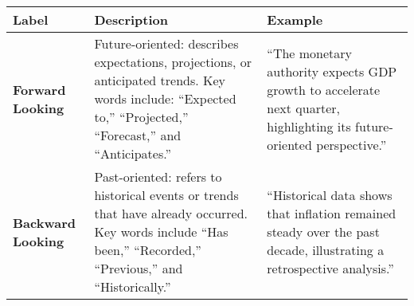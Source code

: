 \begin{table*}
    \caption{}
    \vspace{1em}
    \centering
    \begin{tabular}{p{} p{} p{}}
    \toprule
    \textbf{Label} & \textbf{Description} & \textbf{Example} \\
    \midrule
    \textbf{Forward Looking} & 
    Future-oriented: describes expectations, projections, or anticipated trends. Key words include: ``Expected to,'' ``Projected,'' ``Forecast,'' and ``Anticipates.'' 
    & “The monetary authority expects GDP growth to accelerate next quarter, highlighting its future-oriented perspective.” \\
    \midrule
    \textbf{Backward Looking} & 
    Past-oriented: refers to historical events or trends that have already occurred. Key words include ``Has been,'' ``Recorded,'' ``Previous,'' and ``Historically.'' 
    & “Historical data shows that inflation remained steady over the past decade, illustrating a retrospective analysis.” \\
    \bottomrule
    \end{tabular}
    \label{tb:rbi_forward_looking_guide}
\end{table*}
    